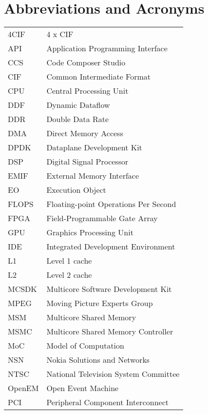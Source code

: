 \chapter*{Abbreviations and Acronyms}


\noindent
\begin{longtable}{@{}p{}p{}@{}}
    4CIF & 4 x CIF \\
    API & Application Programming Interface \\
    CCS & Code Composer Studio \\
    CIF & Common Intermediate Format \\
    CPU & Central Processing Unit \\
    DDF & Dynamic Dataflow \\
    DDR & Double Data Rate \\
    DMA & Direct Memory Access \\
    DPDK & Dataplane Development Kit \\
    DSP & Digital Signal Processor \\
    EMIF & External Memory Interface \\
    EO & Execution Object \\
    FLOPS & Floating-point Operations Per Second \\
    FPGA & Field-Programmable Gate Array \\
    GPU & Graphics Processing Unit \\
    IDE & Integrated Development Environment \\
    L1 & Level 1 cache \\
    L2 & Level 2 cache \\
    MCSDK & Multicore Software Development Kit \\
    MPEG & Moving Picture Experts Group \\
    MSM & Multicore Shared Memory \\
    MSMC & Multicore Shared Memory Controller \\
    MoC & Model of Computation \\
    NSN & Nokia Solutions and Networks \\
    NTSC & National Television System Committee \\
    OpenEM & Open Event Machine \\
    PCI & Peripheral Component Interconnect \\

\end{longtable}

